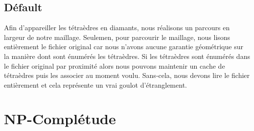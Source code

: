 \documentclass[a4paper,11pt,openany]{article}
\begin{document}
\subsection{Défault}
\noindent
Afin d'appareiller les tétraèdres en diamants, nous réalisons un parcours en largeur de notre maillage. Seulemen, pour parcourir le maillage, nous lisons entièrement le fichier original car nous n'avons aucune garantie géométrique sur la manière dont sont énumérés les tétraèdres. Si les tétraèdres sont énumérés dans le fichier original par proximité alors nous pouvons maintenir un cache de tétraèdres puis les associer au moment voulu. Sans-cela, nous devons lire le fichier entièrement et cela représente un vrai goulot d'étranglement.

\section{NP-Complétude}
%
%
\end{document}
